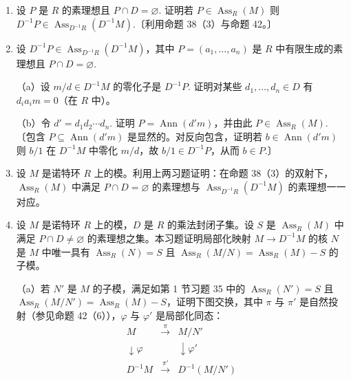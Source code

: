 \begin{enumerate}
（b）若 \(M = Rm_1+\cdots+Rm_n\) 是有限生成 \(R\)-模，证明 \(P \in \operatorname{Supp}(M)\) 当且仅当对某个 \(i = 1, \ldots, n\) 有 \(P \in \operatorname{Supp}(Rm_i)\).〔利用命题 42。〕由此证明 \(P \in \operatorname{Supp}(M)\) 当且仅当 \(P\) 包含 \(M\) 在 \(R\) 中的零化子 \(\operatorname{Ann}(M)\).〔注意 \(\operatorname{Ann}(M) = \bigcap_{i=1}^{n}\operatorname{Ann}(Rm_i)\)，然后利用（a）与第 7.4 节习题 11。〕

\item 设 \(P\) 是 \(R\) 的素理想且 \(P \cap D = \varnothing\). 证明若 \(P \in \operatorname{Ass}_R(M)\) 则 \(D^{-1}P \in \operatorname{Ass}_{D^{-1}R}(D^{-1}M)\).〔利用命题 38（3）与命题 42。〕

\item 设 \(D^{-1}P \in \operatorname{Ass}_{D^{-1}R}(D^{-1}M)\)，其中 \(P = (a_1, \ldots, a_n)\) 是 \(R\) 中有限生成的素理想且 \(P \cap D = \varnothing\).

（a）设 \(m/d \in D^{-1}M\) 的零化子是 \(D^{-1}P\). 证明对某些 \(d_1, \ldots, d_n \in D\) 有 \(d_ia_im = 0\)（在 \(R\) 中）。

（b）令 \(d' = d_1d_2\cdots d_n\). 证明 \(P = \operatorname{Ann}(d'm)\)，并由此 \(P \in \operatorname{Ass}_R(M)\).〔包含 \(P \subseteq \operatorname{Ann}(d'm)\) 是显然的。对反向包含，证明若 \(b \in \operatorname{Ann}(d'm)\) 则 \(b/1\) 在 \(D^{-1}M\) 中零化 \(m/d\)，故 \(b/1 \in D^{-1}P\)，从而 \(b \in P\).〕

\item 设 \(M\) 是诺特环 \(R\) 上的模。利用上两习题证明：在命题 38（3）的双射下，\(\operatorname{Ass}_R(M)\) 中满足 \(P \cap D = \varnothing\) 的素理想与 \(\operatorname{Ass}_{D^{-1}R}(D^{-1}M)\) 的素理想一一对应。

\item 设 \(M\) 是诺特环 \(R\) 上的模，\(D\) 是 \(R\) 的乘法封闭子集。设 \(S\) 是 \(\operatorname{Ass}_R(M)\) 中满足 \(P \cap D \neq \varnothing\) 的素理想之集。本习题证明局部化映射 \(M \to D^{-1}M\) 的核 \(N\) 是 \(M\) 中唯一具有 \(\operatorname{Ass}_R(N) = S\) 且 \(\operatorname{Ass}_R(M/N) = \operatorname{Ass}_R(M)-S\) 的子模。

（a）若 \(N'\) 是 \(M\) 的子模，满足如第 1 节习题 35 中的 \(\operatorname{Ass}_R(N') = S\) 且 \(\operatorname{Ass}_R(M/N') = \operatorname{Ass}_R(M)-S\)，证明下图交换，其中 \(\pi\) 与 \(\pi'\) 是自然投射（参见命题 42（6）），\(\varphi\) 与 \(\varphi'\) 是局部化同态：
\[
\begin{array}{ccc}
M & \xrightarrow{\pi} & M/N'\\
\downarrow\varphi & & \downarrow\varphi'\\
D^{-1}M & \xrightarrow{\pi'} & D^{-1}(M/N')
\end{array}
\]


\end{enumerate}
